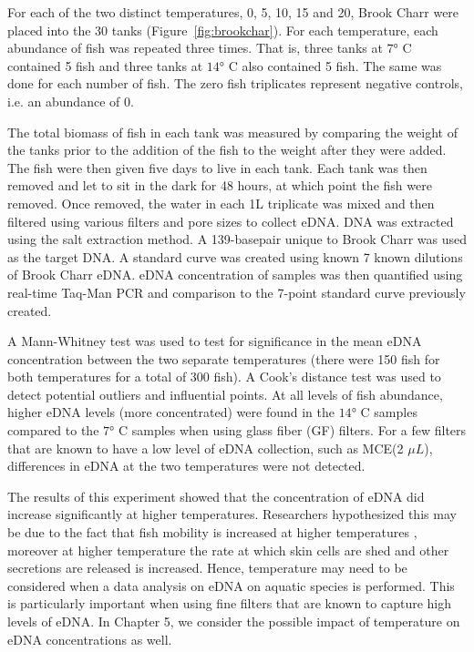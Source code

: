 \newpage

For each of the two distinct temperatures, 0, 5, 10, 15 and 20, Brook Charr were placed into the 30 tanks (Figure~\ref{fig:brookchar}). For each temperature, each abundance of fish was repeated three times. That is, three tanks at $\ang{7}$ C contained 5 fish and three tanks at $\ang{14}$ C also contained 5 fish. The same was done for each number of fish. The zero fish triplicates represent negative controls, i.e. an abundance of 0.

\vspace{5mm}

The total biomass of fish in each tank was measured by comparing the weight of the tanks prior to the addition of the fish to the weight after they were added. The fish were then given five days to live in each tank. Each tank was then removed and let to sit in the dark for 48 hours, at which point the fish were removed. Once removed, the water in each 1L triplicate was mixed and then filtered using various filters and pore sizes to collect eDNA. DNA was extracted using the salt extraction method. A 139-basepair unique to Brook Charr was used as the target DNA. A standard curve was created using known 7 known dilutions of Brook Charr eDNA. eDNA concentration of samples was then quantified using real-time Taq-Man PCR and comparison to the 7-point standard curve previously created.


\vspace{5mm}

A Mann-Whitney test was used to test for significance in the mean eDNA concentration between the two separate temperatures (there were 150 fish for both temperatures for a total of 300 fish).
A Cook’s distance test was used to detect potential outliers and influential points. At all levels of fish abundance, higher eDNA levels (more concentrated) were found in the $\ang{14}$ C samples compared to the $\ang{7}$ C samples when using glass fiber (GF) filters. For a few filters that are known to have a low level of eDNA collection, such as MCE(2 $\mu L$), differences in eDNA at the two temperatures were not detected.

\vspace{5mm}
The results of this experiment showed that the concentration of eDNA  did increase significantly at higher temperatures. Researchers hypothesized this may be due to the fact that fish mobility is increased at higher temperatures \citep{fishmobility}, moreover at higher temperature the rate at which skin cells are shed and other secretions are released is increased.  Hence, temperature may need to be considered when a data analysis on eDNA on aquatic species is performed. This is particularly important when using fine filters that are known to capture high levels of eDNA. In Chapter 5, we consider the possible impact of temperature on eDNA concentrations as well.